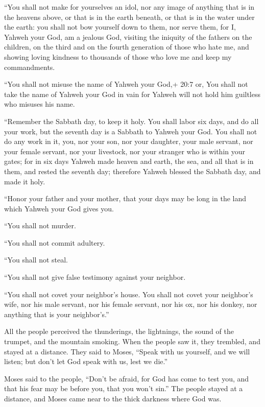  ``You shall not make for yourselves an idol, nor any image
of anything that is in the heavens above, or that is in the earth
beneath, or that is in the water under the earth:  you shall
not bow yourself down to them, nor serve them, for I, Yahweh your God,
am a jealous God, visiting the iniquity of the fathers on the children,
on the third and on the fourth generation of those who hate me,
 and showing loving kindness to thousands of those who love
me and keep my commandments.

 ``You shall not misuse the name of Yahweh your God,+ 20:7
or, You shall not take the name of Yahweh your God in vain for Yahweh
will not hold him guiltless who misuses his name.

 ``Remember the Sabbath day, to keep it holy. 
You shall labor six days, and do all your work,  but the
seventh day is a Sabbath to Yahweh your God. You shall not do any work
in it, you, nor your son, nor your daughter, your male servant, nor your
female servant, nor your livestock, nor your stranger who is within your
gates;  for in six days Yahweh made heaven and earth, the
sea, and all that is in them, and rested the seventh day; therefore
Yahweh blessed the Sabbath day, and made it holy.

 ``Honor your father and your mother, that your days may be
long in the land which Yahweh your God gives you.

 ``You shall not murder.

 ``You shall not commit adultery.

 ``You shall not steal.

 ``You shall not give false testimony against your
neighbor.

 ``You shall not covet your neighbor's house. You shall not
covet your neighbor's wife, nor his male servant, nor his female
servant, nor his ox, nor his donkey, nor anything that is your
neighbor's.''

 All the people perceived the thunderings, the lightnings,
the sound of the trumpet, and the mountain smoking. When the people saw
it, they trembled, and stayed at a distance.  They said to
Moses, ``Speak with us yourself, and we will listen; but don't let God
speak with us, lest we die.''

 Moses said to the people, ``Don't be afraid, for God has
come to test you, and that his fear may be before you, that you won't
sin.''  The people stayed at a distance, and Moses came
near to the thick darkness where God was.

